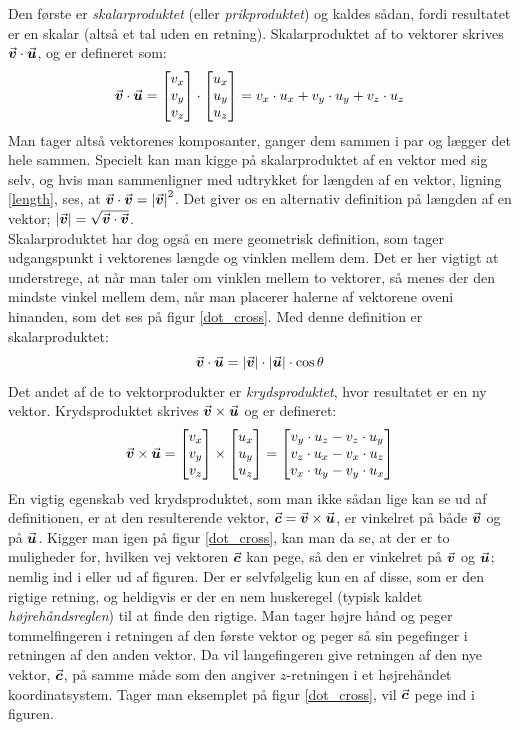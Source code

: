 \noindent
Den første er \emph{skalarproduktet} (eller \emph{prikproduktet}) og kaldes sådan, fordi resultatet er en skalar (altså et tal uden en retning). Skalarproduktet af to vektorer skrives ${\vec{\boldsymbol{v}}} \cdot {\vec{\boldsymbol{u}}}$, og er defineret som:
\begin{equation}
{\vec{\boldsymbol{v}}} \cdot {\vec{\boldsymbol{u}}} = \begin{bmatrix} v_x \\ v_y \\ v_z \end{bmatrix} \cdot \begin{bmatrix} u_x \\ u_y \\ u_z \end{bmatrix}
= v_x \cdot u_x + v_y \cdot u_y + v_z \cdot u_z
\end{equation} 
Man tager altså vektorenes komposanter, ganger dem sammen i par og lægger det hele sammen. Specielt kan man kigge på skalarproduktet af en vektor med sig selv, og hvis man sammenligner med udtrykket for længden af en vektor, ligning \eqref{length}, ses, at ${\vec{\boldsymbol{v}}} \cdot {\vec{\boldsymbol{v}}} = \left| {\vec{\boldsymbol{v}}} \right|^2$. Det giver os en alternativ definition på længden af en vektor; $\left| {\vec{\boldsymbol{v}}} \right| = \sqrt{{\vec{\boldsymbol{v}}} \cdot {\vec{\boldsymbol{v}}}}$.\\ 
Skalarproduktet har dog også en mere geometrisk definition, som tager udgangspunkt i vektorenes længde og vinklen mellem dem. Det er her vigtigt at understrege, at når man taler om vinklen mellem to vektorer, så menes der den mindste vinkel mellem dem, når man placerer halerne af vektorene oveni hinanden, som det ses på figur \ref{dot_cross}. Med denne definition er skalarproduktet:
\begin{equation}
\label{skalarproduct-angle}
{\vec{\boldsymbol{v}}} \cdot {\vec{\boldsymbol{u}}} = \left| {\vec{\boldsymbol{v}}} \right| \cdot \left| {\vec{\boldsymbol{u}}} \right| \cdot \cos \theta
\end{equation} 
Det andet af de to vektorprodukter er \emph{krydsproduktet}, hvor resultatet er en ny vektor. Krydsproduktet skrives ${\vec{\boldsymbol{v}}} \times {\vec{\boldsymbol{u}}}$ og er defineret:
\begin{equation}
{\vec{\boldsymbol{v}}} \times {\vec{\boldsymbol{u}}} = \begin{bmatrix} v_x \\ v_y \\ v_z \end{bmatrix} \times \begin{bmatrix} u_x \\ u_y \\ u_z \end{bmatrix} = \begin{bmatrix} v_y \cdot u_z - v_z \cdot u_y \\ v_z \cdot u_x - v_x \cdot u_z \\ v_x \cdot u_y - v_y \cdot u_x \end{bmatrix}
\end{equation} 
En vigtig egenskab ved krydsproduktet, som man ikke sådan lige kan se ud af definitionen, er at den resulterende vektor, ${\vec{\boldsymbol{c}}} = {\vec{\boldsymbol{v}}} \times {\vec{\boldsymbol{u}}}$, er vinkelret på både ${\vec{\boldsymbol{v}}}$ og på ${\vec{\boldsymbol{u}}}$. Kigger man igen på figur \ref{dot_cross}, kan man da se, at der er to muligheder for, hvilken vej vektoren ${\vec{\boldsymbol{c}}}$ kan pege, så den er vinkelret på ${\vec{\boldsymbol{v}}}$ og ${\vec{\boldsymbol{u}}}$; nemlig ind i eller ud af figuren. Der er selvfølgelig kun en af disse, som er den rigtige retning, og heldigvis er der en nem huskeregel (typisk kaldet \emph{højrehåndsreglen}) til at finde den rigtige. Man tager højre hånd og peger tommelfingeren i retningen af den første vektor og peger så sin pegefinger i retningen af den anden vektor. Da vil langefingeren give retningen af den nye vektor, ${\vec{\boldsymbol{c}}}$, på samme måde som den angiver $z$-retningen i et højrehåndet koordinatsystem. Tager man eksemplet på figur \ref{dot_cross}, vil ${\vec{\boldsymbol{c}}}$ pege ind i figuren.\\
